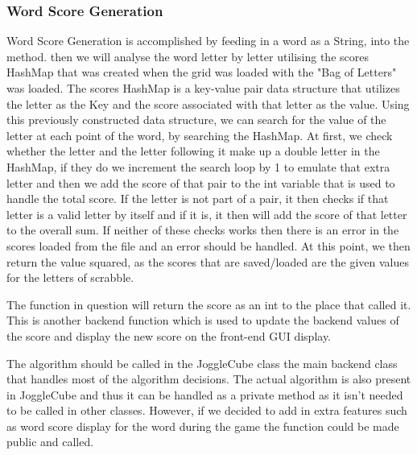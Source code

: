     \subsubsection{Word Score Generation}\label{WordScore}
    Word Score Generation is accomplished by feeding in a word as a String, into the method. then we will analyse the word letter by letter utilising the scores HashMap that was created when the grid was loaded with the "Bag of Letters" was loaded. The scores HashMap is a key-value pair data structure that utilizes the letter as the Key and the score associated with that letter as the value. Using this previously constructed data structure, we can search for the value of the letter at each point of the word, by searching the HashMap. At first, we check whether the letter and the letter following it make up a double letter in the HashMap, if they do we increment the search loop by 1 to emulate that extra letter and then we add the score of that pair to the int variable that is used to handle the total score. If the letter is not part of a pair, it then checks if that letter is a valid letter by itself and if it is, it then will add the score of that letter to the overall sum. If neither of these checks works then there is an error in the scores loaded from the file and an error should be handled. At this point, we then return the value squared, as the scores that are saved/loaded are the given values for the letters of scrabble.
    
    The function in question will return the score as an int to the place that called it. This is another backend function which is used to update the backend values of the score and display the new score on the front-end GUI display.
    
    The algorithm should be called in the JoggleCube class the main backend class that handles most of the algorithm decisions. The actual algorithm is also present in JoggleCube and thus it can be handled as a private method as it isn't needed to be called in other classes. However, if we decided to add in extra features such as word score display for the word during the game the function could be made public and called.
